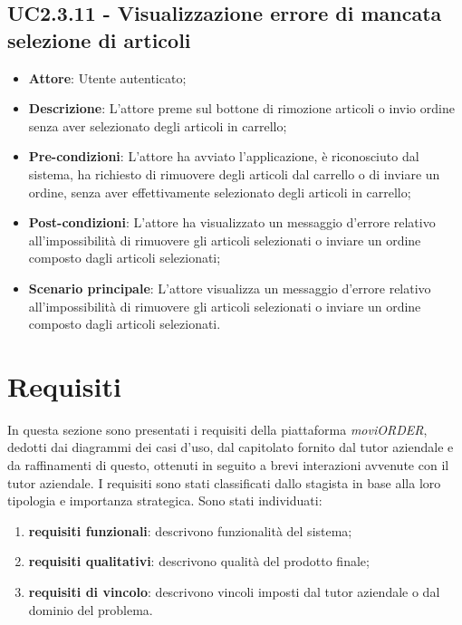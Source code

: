 \subsection{UC2.3.11 - Visualizzazione errore di mancata selezione di articoli}

\begin{itemize}
	\item \textbf{Attore}: Utente autenticato;
	\item \textbf{Descrizione}: L'attore preme sul bottone di rimozione articoli o invio ordine senza aver selezionato degli articoli in carrello;
	\item \textbf{Pre-condizioni}: L'attore ha avviato l'applicazione, è riconosciuto dal sistema, ha richiesto di rimuovere degli articoli dal carrello o di inviare un ordine, senza aver effettivamente selezionato degli articoli in carrello;
	\item \textbf{Post-condizioni}: L'attore ha visualizzato un messaggio d'errore relativo all'impossibilità di rimuovere gli articoli selezionati o inviare un ordine composto dagli articoli selezionati;
	\item \textbf{Scenario principale}: L'attore visualizza un messaggio d'errore relativo all'impossibilità di rimuovere gli articoli selezionati o inviare un ordine composto dagli articoli selezionati.
\end{itemize}

\newpage

\section{Requisiti}

In questa sezione sono presentati i requisiti della piattaforma \textit{moviORDER}, dedotti dai diagrammi dei casi d'uso, dal capitolato fornito dal tutor aziendale e da raffinamenti di questo, ottenuti in seguito a brevi interazioni avvenute con il tutor aziendale. I requisiti sono stati classificati dallo stagista in base alla loro tipologia e importanza strategica. Sono stati individuati:
\begin{enumerate}
	\item \textbf{requisiti funzionali}: descrivono funzionalità del sistema;
	\item \textbf{requisiti qualitativi}: descrivono qualità del prodotto finale;
	\item \textbf{requisiti di vincolo}: descrivono vincoli imposti dal tutor aziendale o dal dominio del problema.
\end{enumerate}

